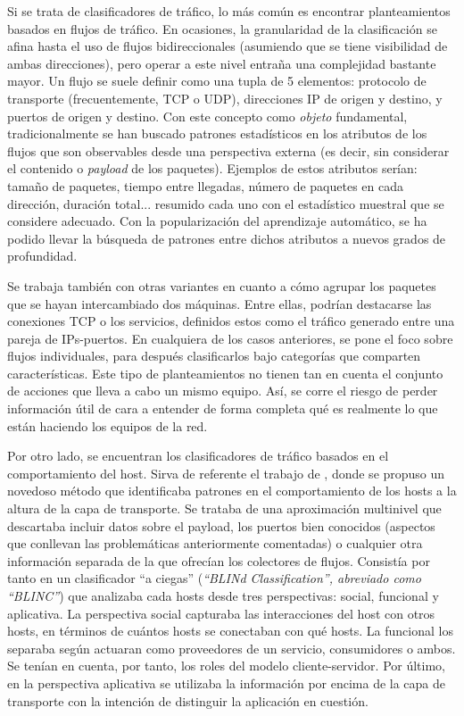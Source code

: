 Si se trata de clasificadores de tráfico, lo más común es encontrar planteamientos basados en flujos de tráfico.
En ocasiones, la granularidad de la clasificación se afina hasta el uso de flujos bidireccionales (asumiendo que se tiene visibilidad de ambas direcciones), pero operar a este nivel entraña una complejidad bastante mayor.
Un flujo se suele definir como una tupla de 5 elementos: protocolo de transporte (frecuentemente, TCP o UDP), direcciones IP de origen y destino, y puertos de origen y destino.
Con este concepto como \emph{objeto} fundamental, tradicionalmente se han buscado patrones estadísticos en los atributos de los flujos que son observables desde una perspectiva externa (es decir, sin considerar el contenido o \emph{payload} de los paquetes).
Ejemplos de estos atributos serían: tamaño de paquetes, tiempo entre llegadas, número de paquetes en cada dirección, duración total... resumido cada uno con el estadístico muestral que se considere adecuado.
Con la popularización del aprendizaje automático, se ha podido llevar la búsqueda de patrones entre dichos atributos a nuevos grados de profundidad.

Se trabaja también con otras variantes en cuanto a cómo agrupar los paquetes que se hayan intercambiado dos máquinas.
Entre ellas, podrían destacarse las conexiones TCP o los servicios, definidos estos como el tráfico generado entre una pareja de IPs-puertos.
En cualquiera de los casos anteriores, se pone el foco sobre flujos individuales, para después clasificarlos bajo categorías que comparten características.
Este tipo de planteamientos no tienen tan en cuenta el conjunto de acciones que lleva a cabo un mismo equipo.
Así, se corre el riesgo de perder información útil de cara a entender de forma completa qué es realmente lo que están haciendo los equipos de la red.

Por otro lado, se encuentran los clasificadores de tráfico basados en el comportamiento del host.
Sirva de referente el trabajo de \cite{KPF05}, donde se propuso un novedoso método que identificaba patrones en el comportamiento de los hosts a la altura de la capa de transporte.
Se trataba de una aproximación multinivel que descartaba incluir datos sobre el payload, los puertos bien conocidos (aspectos que conllevan las problemáticas anteriormente comentadas) o cualquier otra información separada de la que ofrecían los colectores de flujos.
Consistía por tanto en un clasificador ``a ciegas'' (\emph{``BLINd Classification'', abreviado como ``BLINC''}) que analizaba cada hosts desde tres perspectivas: social, funcional y aplicativa.
La perspectiva social capturaba las interacciones del host con otros hosts, en términos de cuántos hosts se conectaban con qué hosts.
La funcional los separaba según actuaran como proveedores de un servicio, consumidores o ambos.
Se tenían en cuenta, por tanto, los roles del modelo cliente-servidor.
Por último, en la perspectiva aplicativa se utilizaba la información por encima de la capa de transporte con la intención de distinguir la aplicación en cuestión.


